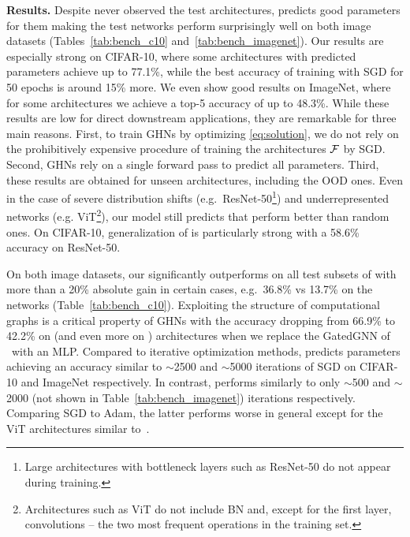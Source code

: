 \textbf{Results.}
Despite \ghnours never observed the test architectures, \ghnours predicts good parameters for them making the test networks perform surprisingly well on both image datasets (Tables~\ref{tab:bench_c10} and~\ref{tab:bench_imagenet}). Our results are especially strong on CIFAR-10, where some architectures with predicted parameters achieve up to 77.1\%, while the best accuracy of training with SGD for 50 epochs is around 15\% more. We even show good results on ImageNet, where for some architectures we achieve a top-5 accuracy of up to 48.3\%. While these results are low for direct downstream applications, they are remarkable for three main reasons. First, to train GHNs by optimizing \eqref{eq:solution}, we do not rely on the prohibitively expensive procedure of training the architectures $\mathcal{F}$ by SGD. Second, GHNs rely on a single forward pass to predict all parameters. Third, these results are obtained for unseen architectures, including the OOD ones. Even in the case of severe distribution shifts (e.g.~ResNet-50\footnote{Large architectures with bottleneck layers such as ResNet-50 do not appear during training.}) and underrepresented networks (e.g. ViT\footnote{Architectures such as ViT do not include BN and, except for the first layer, convolutions -- the two most frequent operations in the training set.}), our model still predicts \params that perform better than random ones. On CIFAR-10, generalization of \ghnours is particularly strong with a 58.6\% accuracy on ResNet-50.	


On both image datasets, our \ghnours significantly outperforms \ghnbase on all test subsets of \dataset with more than a 20\% absolute gain in certain cases, e.g.~36.8\% vs 13.7\% on the \bnfree networks (Table~\ref{tab:bench_c10}). Exploiting the structure of computational graphs is a critical property of GHNs with the accuracy dropping from 66.9\% to 42.2\% on \iid (and even more on \ood) architectures when we replace the GatedGNN of \ghnours~with an MLP.
Compared to iterative optimization methods, \ghnours predicts parameters achieving an accuracy similar to $\sim$2500 and $\sim$5000 iterations of SGD on CIFAR-10 and ImageNet respectively.
In contrast, \ghnbase performs similarly to only $\sim$500 and $\sim$2000 (not shown in Table~\ref{tab:bench_imagenet}) iterations respectively. 
Comparing SGD to Adam, the latter performs worse in general except for the ViT architectures similar to~\citep{zhang2019adam,dosovitskiy2020image}.


